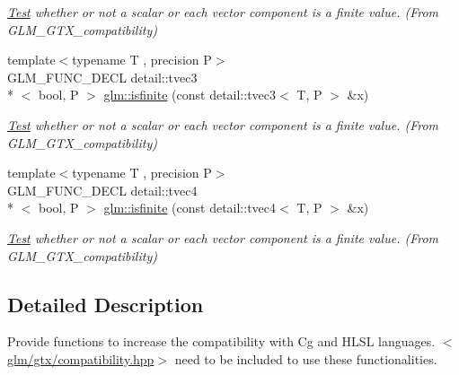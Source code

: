 \begin{DoxyCompactItemize}
\begin{DoxyCompactList}\small\item\em \hyperlink{class_test}{Test} whether or not a scalar or each vector component is a finite value. (From G\-L\-M\-\_\-\-G\-T\-X\-\_\-compatibility) \end{DoxyCompactList}\item 
\hypertarget{group__gtx__compatibility_ga416b6078bffd22e3a56a5c5379ba2cf8}{{\footnotesize template$<$typename T , precision P$>$ }\\G\-L\-M\-\_\-\-F\-U\-N\-C\-\_\-\-D\-E\-C\-L detail\-::tvec3\\*
$<$ bool, P $>$ \hyperlink{group__gtx__compatibility_ga416b6078bffd22e3a56a5c5379ba2cf8}{glm\-::isfinite} (const detail\-::tvec3$<$ T, P $>$ \&x)}\label{group__gtx__compatibility_ga416b6078bffd22e3a56a5c5379ba2cf8}

\begin{DoxyCompactList}\small\item\em \hyperlink{class_test}{Test} whether or not a scalar or each vector component is a finite value. (From G\-L\-M\-\_\-\-G\-T\-X\-\_\-compatibility) \end{DoxyCompactList}\item 
\hypertarget{group__gtx__compatibility_gab256d4b6eaa066847d0629d6dde1dcba}{{\footnotesize template$<$typename T , precision P$>$ }\\G\-L\-M\-\_\-\-F\-U\-N\-C\-\_\-\-D\-E\-C\-L detail\-::tvec4\\*
$<$ bool, P $>$ \hyperlink{group__gtx__compatibility_gab256d4b6eaa066847d0629d6dde1dcba}{glm\-::isfinite} (const detail\-::tvec4$<$ T, P $>$ \&x)}\label{group__gtx__compatibility_gab256d4b6eaa066847d0629d6dde1dcba}

\begin{DoxyCompactList}\small\item\em \hyperlink{class_test}{Test} whether or not a scalar or each vector component is a finite value. (From G\-L\-M\-\_\-\-G\-T\-X\-\_\-compatibility) \end{DoxyCompactList}\end{DoxyCompactItemize}


\subsection{Detailed Description}
Provide functions to increase the compatibility with Cg and H\-L\-S\-L languages. $<$\hyperlink{compatibility_8hpp}{glm/gtx/compatibility.\-hpp}$>$ need to be included to use these functionalities. 

